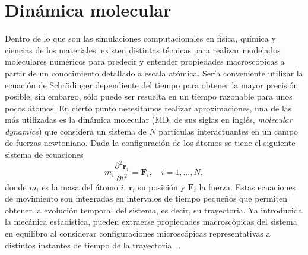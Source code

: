 \section{Dinámica molecular}\label{md}

Dentro de lo que son las simulaciones computacionales en física, química y
ciencias de los materiales, existen distintas técnicas para realizar modelados
moleculares numéricos para predecir y entender propiedades macroscópicas a partir
de un conocimiento detallado a escala atómica. Sería conveniente utilizar la 
ecuación de Schrödinger dependiente del tiempo para obtener la mayor precisión 
posible, sin embargo, sólo puede ser resuelta en un tiempo razonable para unos 
pocos átomos. En cierto punto necesitamos realizar aproximaciones, una de las más
utilizadas es la dinámica molecular (MD, de sus siglas en inglés, 
\textit{molecular dynamics}) que considera un sistema de $N$ partículas 
interactuantes en un campo de fuerzas newtoniano. Dada la configuración de los 
átomos se tiene el siguiente sistema de ecuaciones
$$
m_i \frac{\partial^2 \mathbf{r}_i}{\partial t^2} = \mathbf{F}_i, \quad i = 1,..., N,
$$
donde $m_i$ es la masa del átomo $i$, $\mathbf{r}_i$ su posición y $\mathbf{F}_i$
la fuerza. Estas ecuaciones de movimiento son integradas en intervalos de tiempo
pequeños que permiten obtener la evolución temporal del sistema, es decir, su
trayectoria. Ya introducida la mecánica estadística, pueden extraerse propiedades
macroscópicas del sistema en equilibro al considerar configuraciones microscópicas
representativas a distintos instantes de tiempo de la trayectoria
~\cite{frenkel2001, allen2017}.

